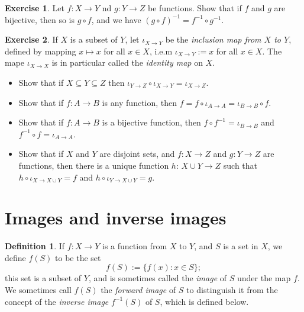 \documentclass[
]{book}
\providecommand{\tightlist}{%
  \setlength{\itemsep}{0pt}\setlength{\parskip}{0pt}}
\theoremstyle{definition}
\newtheorem{definition}{Definition}[chapter]
\theoremstyle{definition}
\theoremstyle{definition}
\newtheorem{exercise}{Exercise}[chapter]
\theoremstyle{definition}
\theoremstyle{remark}
\begin{document}
\begin{exercise}
Let \(f:X\to Y\) nd \(g:Y\to Z\) be functions. Show that if \(f\) and \(g\) are bijective, then so is \(g\circ f\), and we have \((g\circ f)^{-1} = f^{-1} \circ g^{-1}\).
\end{exercise}

\begin{exercise}

If \(X\) is a subset of \(Y\), let \(\iota_{X\to Y}\) be the \emph{inclusion map from \(X\) to \(Y\)}, defined by mapping \(x\mapsto x\) for all \(x\in X\), i.e.m \(\iota_{X\to Y}:=x\) for all \(x\in X\). The mape \(\iota_{X\to X}\) is in particular called the \emph{identity map} on \(X\).

\begin{itemize}
\tightlist
\item
  Show that if \(X\subseteq Y\subseteq Z\) then \(\iota_{Y\to Z}\circ \iota_{X\to Y} = \iota_{X\to Z}\).
\item
  Show that if \(f:A\to B\) is any function, then \(f= f\circ \iota_{A\to A} = \iota_{B\to B}\circ f\).
\item
  Show that if \(f:A\to B\) is a bijective function, then \(f\circ f^{-1} = \iota_{B\to B}\) and \(f^{-1}\circ f =\iota_{A\to A}\).
\item
  Show that if \(X\) and \(Y\) are disjoint sets, and \(f:X\to Z\) and \(g: Y\to Z\) are functions, then there is a unique function \(h\): \(X\cup Y \to Z\) such that \(h \circ \iota_{X\to X\cup Y} =f\) and \(h \circ \iota_{Y\to X\cup Y} =g\).
\end{itemize}

\end{exercise}

\section{Images and inverse images}\label{images-and-inverse-images}

\begin{definition}
If \(f:X\to Y\) is a function from \(X\) to \(Y\), and \(S\) is a set in \(X\), we define \(f(S)\) to be the set
\[
f(S):=\{f(x):x\in S\};
\]
this set is a subset of \(Y\), and is sometimes called the \emph{image} of \(S\) under the map \(f\). We sometimes call \(f(S)\) the \emph{forward image} of \(S\) to distinguish it from the concept of the \emph{inverse image} \(f^{-1}(S)\) of \(S\), which is defined below.
\end{definition}
\end{document}
